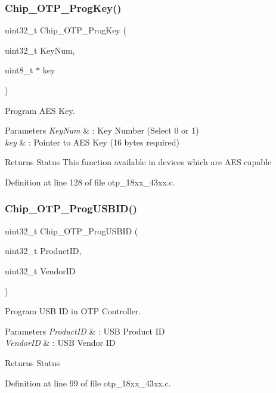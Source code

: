 \subsubsection{\texorpdfstring{Chip\+\_\+\+O\+T\+P\+\_\+\+Prog\+Key()}{Chip\_OTP\_ProgKey()}}
{\footnotesize\ttfamily uint32\+\_\+t Chip\+\_\+\+O\+T\+P\+\_\+\+Prog\+Key (\begin{DoxyParamCaption}\item[{uint32\+\_\+t}]{Key\+Num,  }\item[{uint8\+\_\+t $\ast$}]{key }\end{DoxyParamCaption})}



Program A\+ES Key. 


\begin{DoxyParams}{Parameters}
{\em Key\+Num} & \+: Key Number (Select 0 or 1) \\
\hline
{\em key} & \+: Pointer to A\+ES Key (16 bytes required) \\
\hline
\end{DoxyParams}
\begin{DoxyReturn}{Returns}
Status This function available in devices which are A\+ES capable 
\end{DoxyReturn}


Definition at line 128 of file otp\+\_\+18xx\+\_\+43xx.\+c.

\mbox{\label{group___o_t_p__18_x_x__43_x_x_ga040917e9f2de58ca6cbff2993a5232b9}} 
\subsubsection{\texorpdfstring{Chip\+\_\+\+O\+T\+P\+\_\+\+Prog\+U\+S\+B\+I\+D()}{Chip\_OTP\_ProgUSBID()}}
{\footnotesize\ttfamily uint32\+\_\+t Chip\+\_\+\+O\+T\+P\+\_\+\+Prog\+U\+S\+B\+ID (\begin{DoxyParamCaption}\item[{uint32\+\_\+t}]{Product\+ID,  }\item[{uint32\+\_\+t}]{Vendor\+ID }\end{DoxyParamCaption})}



Program U\+SB ID in O\+TP Controller. 


\begin{DoxyParams}{Parameters}
{\em Product\+ID} & \+: U\+SB Product ID \\
\hline
{\em Vendor\+ID} & \+: U\+SB Vendor ID \\
\hline
\end{DoxyParams}
\begin{DoxyReturn}{Returns}
Status 
\end{DoxyReturn}


Definition at line 99 of file otp\+\_\+18xx\+\_\+43xx.\+c.

